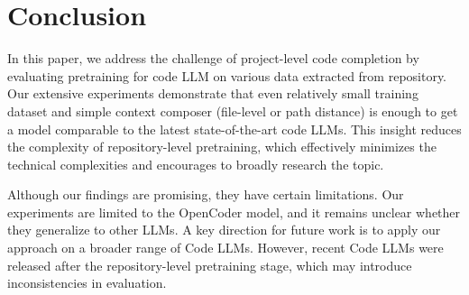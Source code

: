 \section{Conclusion}
In this paper, we address the challenge of project-level code completion by evaluating pretraining for code LLM on various data extracted from repository. 
Our extensive experiments demonstrate that even relatively small training dataset and simple context composer (\eg file-level or path distance) is enough to get a model comparable to the latest state-of-the-art code LLMs. 
This insight reduces the complexity of repository-level pretraining, which effectively minimizes the technical complexities and encourages to broadly research the topic.

Although our findings are promising, they have certain limitations. Our experiments are limited to the OpenCoder model, and it remains unclear whether they generalize to other LLMs. A key direction for future work is to apply our approach on a broader range of Code LLMs. However, recent Code LLMs were released after the repository-level pretraining stage, which may introduce inconsistencies in evaluation.

